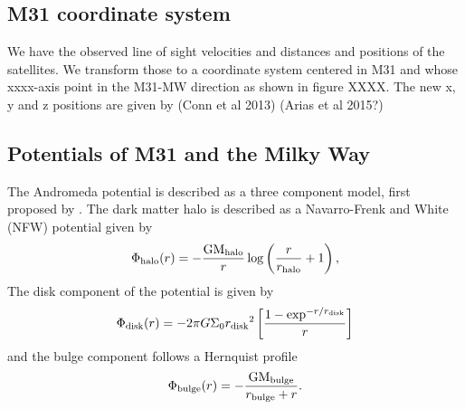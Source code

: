 \documentclass[useAMS,usenatbib]{mn2e}
\begin{document}
\subsection{M31 coordinate system}
We have the observed line of sight velocities and distances and positions of the satellites. 
We transform those to a coordinate system centered in M31 and whose xxxx-axis point in the M31-MW direction as shown in figure XXXX.
The new x, y and z positions are given by (Conn et al 2013) (Arias et al 2015?)\citep{2013ApJ...766..120C,2013Natur.493...62I}

%
%
%

\subsection{Potentials of M31 and the Milky Way}
The Andromeda potential is described as a three component model, first proposed by \cite{2006MNRAS.366..996G}.  
The dark matter halo is described as a Navarro-Frenk and White (NFW) potential \citep{1997ApJ...490..493N} given by
\begin{equation}
\Phi_{\rm{halo}}(r)=-\frac{\rm{GM_{\rm{halo}}}}{r}\log \left(\frac{r}{r_{\rm{halo}}}+1\right),
\label{NFW}
\end{equation}   
The disk component of the potential is given by
\begin{equation}
\Phi_{\rm{disk}}(r)=-2{\pi}G\Sigma_{0}{r_{\rm{disk}}}^2\left[\frac{1-\exp^{-r/r_{\rm{disk}}}}{r}\right]
\end{equation}   
and the bulge component follows a Hernquist profile \citep{1990ApJ...356..359H}
\begin{equation}
\Phi_{\rm{bulge}}(r)=-\frac{\rm{GM_{{bulge}}}}{r_{\rm{bulge}}+r}\mbox{.}
\label{Hernquist}
\end{equation}\\
\end{document}
